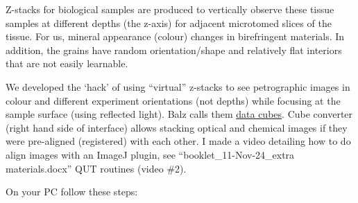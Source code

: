 	Z-stacks for biological samples are produced to vertically observe these tissue samples at different depths (the z-axis) for adjacent microtomed slices of the tissue. For us, mineral appearance (colour) changes in birefringent materials. In addition, the grains have random orientation/shape and relatively flat interiors that are not easily learnable.
	
	We developed the `hack' of using ``virtual'' z-stacks to see petrographic images in colour and different experiment orientations (not depths) while focusing at the sample surface (using reflected light). Balz calls them \ul{data cubes}. Cube converter (right hand side of interface) allows stacking optical and chemical images if they were pre-aligned (registered) with each other. I made a video detailing how to do align images with an ImageJ plugin, see ``booklet\_11-Nov-24\_extra materials.docx'' QUT routines (video \#2).
	
	On your PC follow these steps:
	
